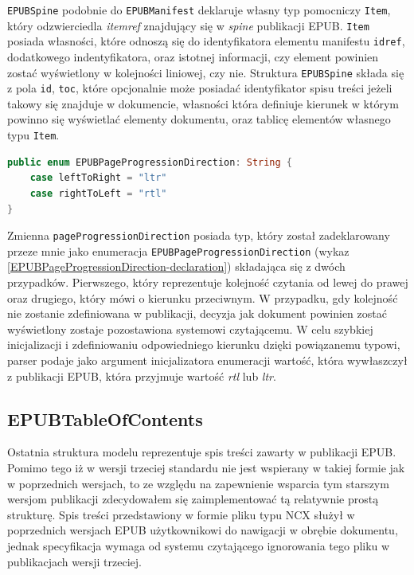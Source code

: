 \texttt{EPUBSpine} podobnie do \texttt{EPUBManifest} deklaruje własny typ pomocniczy \texttt{Item}, który odzwierciedla \textit{itemref} znajdujący się w \textit{spine} publikacji EPUB. \texttt{Item} posiada własności, które odnoszą się do identyfikatora elementu manifestu \texttt{idref}, dodatkowego indentyfikatora, oraz istotnej informacji, czy element powinien zostać wyświetlony w kolejności liniowej, czy nie. Struktura \texttt{EPUBSpine} składa się z pola \texttt{id}, \texttt{toc}, które opcjonalnie może posiadać identyfikator spisu treści jeżeli takowy się znajduje w dokumencie, własności która definiuje kierunek w którym powinno się wyświetlać elementy dokumentu, oraz tablicę elementów własnego typu \texttt{Item}.

\begin{lstlisting}[language=swift,label={EPUBPageProgressionDirection-declaration},caption={Enumeracja EPUBPageProgressionDirection}]
public enum EPUBPageProgressionDirection: String {
    case leftToRight = "ltr"
    case rightToLeft = "rtl"
}
\end{lstlisting}

Zmienna \texttt{pageProgressionDirection} posiada typ, który został zadeklarowany przeze mnie jako enumeracja \texttt{EPUBPageProgressionDirection} (wykaz \ref{EPUBPageProgressionDirection-declaration}) składająca się z dwóch przypadków. Pierwszego, który reprezentuje kolejność czytania od lewej do prawej oraz drugiego, który mówi o kierunku przeciwnym. W przypadku, gdy kolejność nie zostanie zdefiniowana w publikacji, decyzja jak dokument powinien zostać wyświetlony zostaje pozostawiona systemowi czytającemu. W celu szybkiej inicjalizacji i zdefiniowaniu odpowiedniego kierunku dzięki powiązanemu typowi, parser podaje jako argument inicjalizatora enumeracji wartość, która wywłaszczył z publikacji EPUB, która przyjmuje wartość \textit{rtl} lub \textit{ltr}.

\subsection{EPUBTableOfContents}

Ostatnia struktura modelu reprezentuje spis treści zawarty w publikacji EPUB. Pomimo tego iż w wersji trzeciej standardu nie jest wspierany w takiej formie jak w poprzednich wersjach, to ze względu na zapewnienie wsparcia tym starszym wersjom publikacji zdecydowałem się zaimplementować tą relatywnie prostą strukturę. Spis treści przedstawiony w formie pliku typu NCX służył w poprzednich wersjach EPUB użytkownikowi do nawigacji w obrębie dokumentu, jednak specyfikacja wymaga od systemu czytającego ignorowania tego pliku w publikacjach wersji trzeciej.

